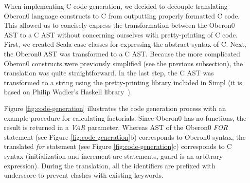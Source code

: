 When implementing C code generation, we decided to decouple translating
Oberon0 language constructs to C from outputting properly formatted
C code. This allowed us to concisely express the transformation between
the\emph{ }Oberon0 AST to a C AST without concerning ourselves with
pretty-printing of C code. First, we created Scala case classes for
expressing the abstract syntax of C. Next, the Oberon0 AST was transformed
to a C AST. Because the more complicated Oberon0 constructs were previously
simplified (see the previous subsection), the translation was quite
straightforward. In the last step, the C AST was transformed to a
string using the pretty-printing library included in Simpl (it is
based on Philip Wadler's Haskell library~\cite{wadler-prettyprinter}).

Figure \ref{fig:code-generation} illustrates the code generation
process with an example procedure for calculating factorials. Since
Oberon0 has no functions, the result is returned in a \emph{VAR} parameter.
Whereas AST of the Oberon0 \emph{FOR} statement (see Figure \ref{fig:code-generation}b)
corresponds to Oberon0 syntax, the translated \emph{for} statement
(see Figure \ref{fig:code-generation}c) corresponds to C syntax (initialization
and increment are statements, guard is an arbitrary expression). During
the translation, all the identifiers are prefixed with underscore
to prevent clashes with existing keywords.

